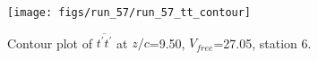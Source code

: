 \begin{figure}[H]
\centering
\texttt{[image: figs/run\_57/run\_57\_tt\_contour]}
\caption{Contour plot of $\overline{t^\prime t^\prime}$ at $z/c$=9.50, $V_{free}$=27.05, station 6.}
\label{fig:run_57_tt_contour}
\end{figure}


